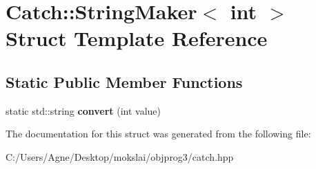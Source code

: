 \hypertarget{struct_catch_1_1_string_maker_3_01int_01_4}{}\section{Catch\+:\+:String\+Maker$<$ int $>$ Struct Template Reference}
\label{struct_catch_1_1_string_maker_3_01int_01_4}
\subsection*{Static Public Member Functions}
\begin{DoxyCompactItemize}
\item 
\mbox{\label{struct_catch_1_1_string_maker_3_01int_01_4_aab096e55fb7283f6ad47b5ca277e22e8}} 
static std\+::string {\bfseries convert} (int value)
\end{DoxyCompactItemize}


The documentation for this struct was generated from the following file\+:\begin{DoxyCompactItemize}
\item 
C\+:/\+Users/\+Agne/\+Desktop/mokslai/objprog3/catch.\+hpp\end{DoxyCompactItemize}
